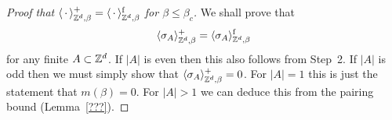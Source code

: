 \begin{proof}[Proof that $\langle\,\cdot\,\rangle_{\mathbb Z^d,\beta}^+=\langle\,\cdot\,\rangle_{\mathbb Z^d,\beta}^{\operatorname{f}}$ for $\beta\leq\beta_c$]
    We shall prove that
    \[
        \langle\sigma_A\rangle^+_{\mathbb Z^d,\beta}=\langle\sigma_A\rangle^{\operatorname{f}}_{\mathbb Z^d,\beta}
    \]
    for any finite $A\subset\mathbb Z^d$.
    If $|A|$ is even then this also follows from Step~2.
    If $|A|$ is odd then we must simply show that $\langle\sigma_A\rangle^+_{\mathbb Z^d,\beta}=0$.
    For $|A|=1$ this is just the statement that $m(\beta)=0$.
    For $|A|>1$ we can deduce this from the pairing bound (Lemma~\ref{???}).
\end{proof}
